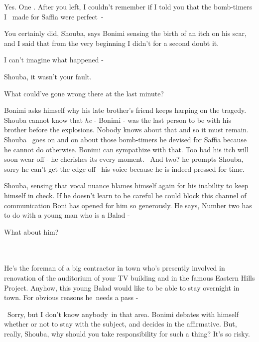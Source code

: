 \documentclass[letterpaper]{article}
\begin{document}
{\textquotedbl}Yes. One . After you left, I couldn't remember if I told you that the bomb-timers I \ made for Saffia
were perfect~-{\textquotedbl} 

{\textquotedbl}You certainly did, Shouba,{\textquotedbl} says Bonimi sensing the birth of an itch on his scar,
{\textquotedbl}and I said that from the very beginning I didn't for a second doubt it.{\textquotedbl}

{\textquotedbl}I can't imagine what happened -{\textquotedbl} 

{\textquotedbl}Shouba, it wasn't your fault.{\textquotedbl} 

{\textquotedbl}What could've gone wrong there at the last minute?{\textquotedbl}

Bonimi asks himself why his late brother's friend keeps harping on the tragedy. Shouba cannot know that \textit{he} -
Bonimi - was the last person to be with his brother before the explosions. Nobody knows about that and so it must
remain. Shouba~ goes on and on about those bomb-timers he devised for Saffia because he cannot do otherwise. Bonimi can
sympathize with that. Too bad his itch will soon wear off - he cherishes its every moment. ~{\textquotedbl}And
two?{\textquotedbl} he prompts Shouba, sorry he can't get the edge off \ his voice because he is indeed pressed for
time.

Shouba, sensing that vocal nuance blames himself again for his inability to keep himself in check. If he doesn't learn
to be careful he could block this channel of communication Boni has opened for him so generously. He says,
{\textquotedbl}Number two has to do with a young man who is a Balad -{\textquotedbl}

{\textquotedbl}What about him?{\textquotedbl}
~~~~~~~~~~~~~~~~~~~~~~~~~~~~~~~~~~~~~~~~~~~~~~~~~~~~~~~~~~~~~~~~~~~~~~~~~~~~~~ 

{\textquotedbl}He's the foreman of a big contractor in town who's presently involved in renovation of the auditorium of
your TV building and in the famous Eastern Hills Project. Anyhow, this young Balad would like to be able to stay
overnight in town. For obvious reasons he~needs a pass -{\textquotedbl}

~{\textquotedbl}Sorry, but I don't know anybody~in that area.{\textquotedbl} Bonimi debates with himself whether or not
to stay with the subject, and decides in the affirmative. {\textquotedbl}But, really, Shouba, why should you take
responsibility for such a thing? It's so risky.{\textquotedbl} 
\end{document}
